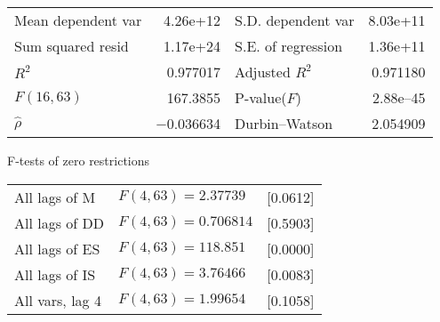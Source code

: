 \documentclass[11pt]{article}
\begin{document}
\begin{center}
\vspace{1ex}
\begin{tabular}{lrlr}
Mean dependent var &  4.26\textrm{e+12} & S.D. dependent var &  8.03\textrm{e+11} \\
Sum squared resid &  1.17\textrm{e+24} & S.E. of regression &  1.36\textrm{e+11} \\
$R^2$ &  0.977017 & Adjusted $R^2$ &  0.971180 \\
$F(16, 63)$ &  167.3855 & P-value($F$) &  2.88\textrm{e--45} \\
$\hat{\rho}$ & $-$0.036634 & Durbin--Watson &  2.054909 \\
\end{tabular}


\end{center}

\begin{center}
F-tests of zero restrictions\\[1em]
\begin{tabular}{lll}
All lags of M & $F(4, 63) = 2.37739$ & [0.0612]\\
All lags of DD & $F(4, 63) = 0.706814$ & [0.5903]\\
All lags of ES & $F(4, 63) = 118.851$ & [0.0000]\\
All lags of IS & $F(4, 63) = 3.76466$ & [0.0083]\\
All vars, lag 4 & $F(4, 63) = 1.99654$ & [0.1058]\\
\end{tabular}
\end{center}

\clearpage
\end{document}
